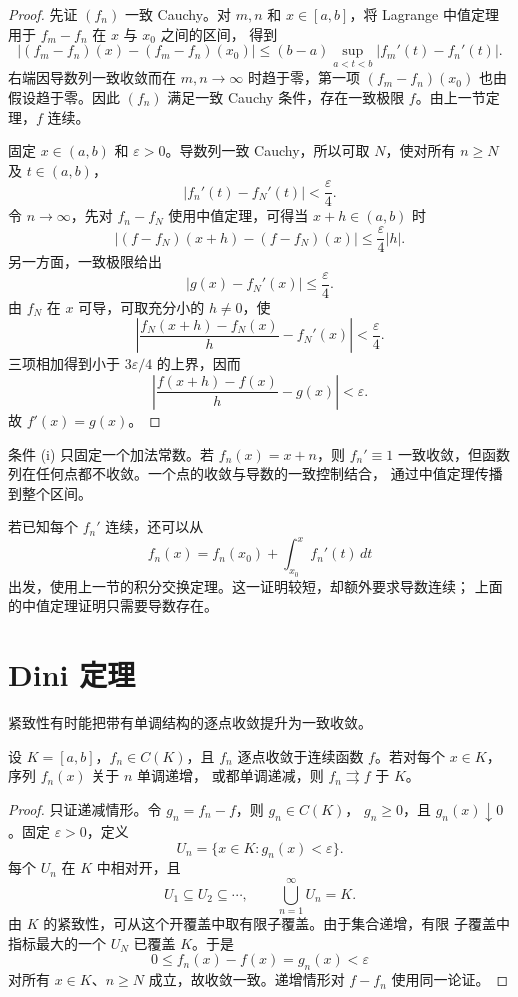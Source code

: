 \begin{proof}
先证 \((f_n)\) 一致 Cauchy。对 \(m,n\) 和 \(x\in[a,b]\)，将
Lagrange 中值定理用于 \(f_m-f_n\) 在 \(x\) 与 \(x_0\) 之间的区间，
得到
\[
 |(f_m-f_n)(x)-(f_m-f_n)(x_0)|
 \le(b-a)\sup_{a<t<b}|f_m'(t)-f_n'(t)|.
\]
右端因导数列一致收敛而在 \(m,n\to\infty\) 时趋于零，第一项
\((f_m-f_n)(x_0)\) 也由假设趋于零。因此 \((f_n)\) 满足一致 Cauchy
条件，存在一致极限 \(f\)。由上一节定理，\(f\) 连续。

固定 \(x\in(a,b)\) 和 \(\varepsilon>0\)。导数列一致 Cauchy，所以可取
\(N\)，使对所有 \(n\ge N\) 及 \(t\in(a,b)\)，
\[
 |f_n'(t)-f_N'(t)|<\frac{\varepsilon}{4}.
\]
令 \(n\to\infty\)，先对 \(f_n-f_N\) 使用中值定理，可得当
\(x+h\in(a,b)\) 时
\[
 |(f-f_N)(x+h)-(f-f_N)(x)|
 \le\frac{\varepsilon}{4}|h|.
\]
另一方面，一致极限给出
\[
 |g(x)-f_N'(x)|\le\frac{\varepsilon}{4}.
\]
由 \(f_N\) 在 \(x\) 可导，可取充分小的 \(h\ne0\)，使
\[
 \left|
 \frac{f_N(x+h)-f_N(x)}h-f_N'(x)
 \right|<\frac{\varepsilon}{4}.
\]
三项相加得到小于 \(3\varepsilon/4\) 的上界，因而
\[
 \left|\frac{f(x+h)-f(x)}h-g(x)\right|<\varepsilon.
\]
故 \(f'(x)=g(x)\)。
\end{proof}

条件 (i) 只固定一个加法常数。若 \(f_n(x)=x+n\)，则 \(f_n'\equiv1\)
一致收敛，但函数列在任何点都不收敛。一个点的收敛与导数的一致控制结合，
通过中值定理传播到整个区间。

若已知每个 \(f_n'\) 连续，还可以从
\[
 f_n(x)=f_n(x_0)+\int_{x_0}^x f_n'(t)\,dt
\]
出发，使用上一节的积分交换定理。这一证明较短，却额外要求导数连续；
上面的中值定理证明只需要导数存在。

\section{Dini 定理}

紧致性有时能把带有单调结构的逐点收敛提升为一致收敛。

\begin{theorem}[Dini 定理]
\label{thm:dini}
设 \(K=[a,b]\)，\(f_n\in C(K)\)，且 \(f_n\) 逐点收敛于连续函数
\(f\)。若对每个 \(x\in K\)，序列 \(f_n(x)\) 关于 \(n\) 单调递增，
或都单调递减，则 \(f_n\rightrightarrows f\) 于 \(K\)。
\end{theorem}

\begin{proof}
只证递减情形。令 \(g_n=f_n-f\)，则 \(g_n\in C(K)\)，
\(g_n\ge0\)，且 \(g_n(x)\downarrow0\)。固定 \(\varepsilon>0\)，定义
\[
 U_n=\{x\in K:g_n(x)<\varepsilon\}.
\]
每个 \(U_n\) 在 \(K\) 中相对开，且
\[
 U_1\subseteq U_2\subseteq\cdots,\qquad
 \bigcup_{n=1}^\infty U_n=K.
\]
由 \(K\) 的紧致性，可从这个开覆盖中取有限子覆盖。由于集合递增，有限
子覆盖中指标最大的一个 \(U_N\) 已覆盖 \(K\)。于是
\[
 0\le f_n(x)-f(x)=g_n(x)<\varepsilon
\]
对所有 \(x\in K\)、\(n\ge N\) 成立，故收敛一致。递增情形对
\(f-f_n\) 使用同一论证。
\end{proof}

